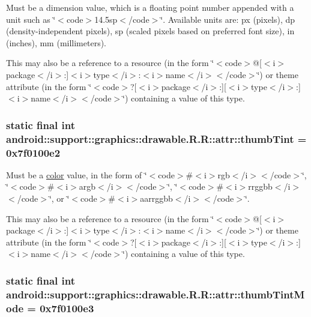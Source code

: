 Must be a dimension value, which is a floating point number appended with a unit such as \char`\"{}$<$code$>$14.5sp$<$/code$>$\char`\"{}. Available units are: px (pixels), dp (density-independent pixels), sp (scaled pixels based on preferred font size), in (inches), mm (millimeters). 

This may also be a reference to a resource (in the form \char`\"{}$<$code$>$@\mbox{[}$<$i$>$package$<$/i$>$:\mbox{]}$<$i$>$type$<$/i$>$:$<$i$>$name$<$/i$>$$<$/code$>$\char`\"{}) or theme attribute (in the form \char`\"{}$<$code$>$?\mbox{[}$<$i$>$package$<$/i$>$:\mbox{]}\mbox{[}$<$i$>$type$<$/i$>$:\mbox{]}$<$i$>$name$<$/i$>$$<$/code$>$\char`\"{}) containing a value of this type. \hypertarget{classandroid_1_1support_1_1graphics_1_1drawable_1_1_r_1_1attr_7903a93cef018320465258849802e8b5}{
\subsubsection[{thumbTint}]{\setlength{\rightskip}{0pt plus 5cm}static final int android::support::graphics::drawable.R.R::attr::thumbTint = 0x7f0100e2}}
\label{classandroid_1_1support_1_1graphics_1_1drawable_1_1_r_1_1attr_7903a93cef018320465258849802e8b5}


Must be a \hyperlink{classandroid_1_1support_1_1graphics_1_1drawable_1_1_r_1_1color}{color} value, in the form of \char`\"{}$<$code$>$\#$<$i$>$rgb$<$/i$>$$<$/code$>$\char`\"{}, \char`\"{}$<$code$>$\#$<$i$>$argb$<$/i$>$$<$/code$>$\char`\"{}, \char`\"{}$<$code$>$\#$<$i$>$rrggbb$<$/i$>$$<$/code$>$\char`\"{}, or \char`\"{}$<$code$>$\#$<$i$>$aarrggbb$<$/i$>$$<$/code$>$\char`\"{}. 

This may also be a reference to a resource (in the form \char`\"{}$<$code$>$@\mbox{[}$<$i$>$package$<$/i$>$:\mbox{]}$<$i$>$type$<$/i$>$:$<$i$>$name$<$/i$>$$<$/code$>$\char`\"{}) or theme attribute (in the form \char`\"{}$<$code$>$?\mbox{[}$<$i$>$package$<$/i$>$:\mbox{]}\mbox{[}$<$i$>$type$<$/i$>$:\mbox{]}$<$i$>$name$<$/i$>$$<$/code$>$\char`\"{}) containing a value of this type. \hypertarget{classandroid_1_1support_1_1graphics_1_1drawable_1_1_r_1_1attr_1aa9d308f452684be2218b5f042a6b88}{
\subsubsection[{thumbTintMode}]{\setlength{\rightskip}{0pt plus 5cm}static final int android::support::graphics::drawable.R.R::attr::thumbTintMode = 0x7f0100e3}}
\label{classandroid_1_1support_1_1graphics_1_1drawable_1_1_r_1_1attr_1aa9d308f452684be2218b5f042a6b88}


